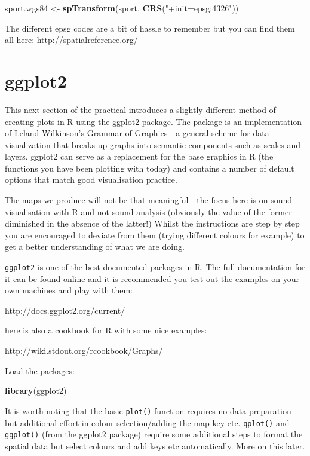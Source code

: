 \documentclass[]{article}
\newenvironment{Shaded}{}{}
\newcommand{\KeywordTok}[1]{\textcolor[rgb]{0.00,0.44,0.13}{\textbf{{#1}}}}
\newcommand{\StringTok}[1]{\textcolor[rgb]{0.25,0.44,0.63}{{#1}}}
\newcommand{\NormalTok}[1]{{#1}}
\begin{document}
\begin{Shaded}
\begin{Highlighting}[]
\NormalTok{sport.wgs84 <- }\KeywordTok{spTransform}\NormalTok{(sport, }\KeywordTok{CRS}\NormalTok{(}\StringTok{"+init=epsg:4326"}\NormalTok{))}
\end{Highlighting}
\end{Shaded}
The different epsg codes are a bit of hassle to remember but you can
find them all here: http://spatialreference.org/

\section{ggplot2}

This next section of the practical introduces a slightly different
method of creating plots in R using the ggplot2 package. The package is
an implementation of Leland Wilkinson's Grammar of Graphics - a general
scheme for data visualization that breaks up graphs into semantic
components such as scales and layers. ggplot2 can serve as a replacement
for the base graphics in R (the functions you have been plotting with
today) and contains a number of default options that match good
visualisation practice.

The maps we produce will not be that meaningful - the focus here is on
sound visualisation with R and not sound analysis (obviously the value
of the former diminished in the absence of the latter!) Whilst the
instructions are step by step you are encouraged to deviate from them
(trying different colours for example) to get a better understanding of
what we are doing.

\texttt{ggplot2} is one of the best documented packages in R. The full
documentation for it can be found online and it is recommended you test
out the examples on your own machines and play with them:

http://docs.ggplot2.org/current/

here is also a cookbook for R with some nice examples:

http://wiki.stdout.org/rcookbook/Graphs/

Load the packages:

\begin{Shaded}
\begin{Highlighting}[]
\KeywordTok{library}\NormalTok{(ggplot2)}
\end{Highlighting}
\end{Shaded}
It is worth noting that the basic \texttt{plot()} function requires no
data preparation but additional effort in colour selection/adding the
map key etc. \texttt{qplot()} and \texttt{ggplot()} (from the ggplot2
package) require some additional steps to format the spatial data but
select colours and add keys etc automatically. More on this later.
\end{document}
